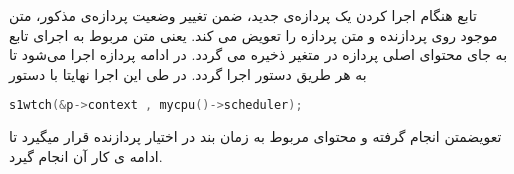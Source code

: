 تابع
هنگام اجرا کردن یک پردازه‌ی جدید، ضمن تغییر وضعیت پردازه‌ی مذکور، متن موجود روی پردازنده و متن پردازه را تعویض می کند. یعنی متن مربوط به اجرای تابع
به جای محتوای اصلی پردازه در متغیر
ذخیره می گردد. در ادامه پردازه اجرا می‌شود تا به هر طریق دستور
اجرا گردد. در طی این اجرا نهایتا با دستور
\begin{lstlisting}[language=c++]
s1wtch(&p->context , mycpu()->scheduler);
\end{lstlisting}
تعویضمتن انجام گرفته و محتوای مربوط به زمان بند در اختیار پردازنده قرار میگیرد تا ادامه ی کار آن انجام گیرد.